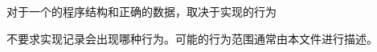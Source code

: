 对于一个\wellform{}的程序结构和正确的数据，取决于实现的行为

\begin{note}[\noindent]
  不要求实现记录会出现哪种行为。可能的行为范围通常由本文件进行描述。
\end{note}
